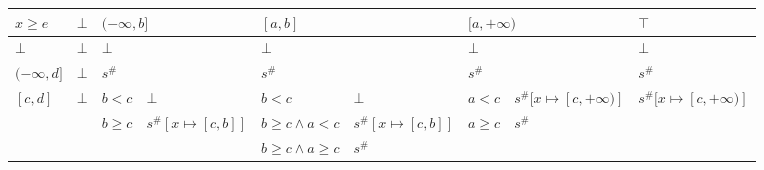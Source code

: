 \documentclass{article}
\begin{document}
\begin{table}[]
\begin{tabular}{|l|l|ll|ll|ll|l|}
\hline
$x \ge e$                   & $\bot$                  & \multicolumn{2}{l|}{$(-\infty, b]$}                                    & \multicolumn{2}{l|}{$[a, b]$}                      & \multicolumn{2}{l|}{$[a, +\infty)$}                         & $\top$                                          \\ \hline
$\bot$                          & $\bot$                  & \multicolumn{2}{l|}{$\bot$}                                            & \multicolumn{2}{l|}{$\bot$}                        & \multicolumn{2}{l|}{$\bot$}                                 & $\bot$                                          \\ \hline
$(-\infty, d]$                  & $\bot$                  & \multicolumn{2}{l|}{$s^\#$}                                            & \multicolumn{2}{l|}{$s^\#$}                        & \multicolumn{2}{l|}{$s^\#$}                                 & $s^\#$                                          \\ \hline
\multirow{3}{*}{$[c, d]$}       & \multirow{3}{*}{$\bot$} & $b < c$                    & $\bot$                                    & $b < c$                 & $\bot$                   & $a < c$                    & $s^\#[x \mapsto [c, +\infty)]$ & \multirow{3}{*}{$s^\#[x \mapsto [c, +\infty)]$} \\
                                &                         & \multirow{2}{*}{$b \ge c$} & \multirow{2}{*}{$s^\#[x \mapsto [c, b]]$} & $b \ge c \land a < c$   & $s^\#[x \mapsto [c, b]]$ & \multirow{2}{*}{$a \ge c$} & \multirow{2}{*}{$s^\#$}        &                                                 \\
                                &                         &                            &                                           & $b \ge c \land a \ge c$ & $s^\#$                   &                            &                                &                                                 \\ \hline

\end{tabular}
\end{table}
\end{document}
